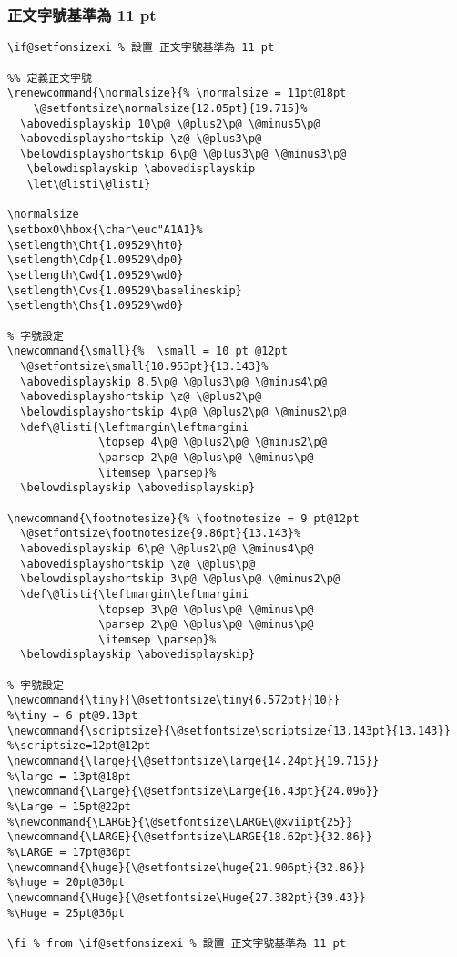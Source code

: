 \clearpage
\subsubsection{正文字號基準為 11 pt}
\begin{lstlisting}[firstnumber=309]
\if@setfonsizexi % 設置 正文字號基準為 11 pt

%% 定義正文字號
\renewcommand{\normalsize}{% \normalsize = 11pt@18pt
    \@setfontsize\normalsize{12.05pt}{19.715}%
  \abovedisplayskip 10\p@ \@plus2\p@ \@minus5\p@
  \abovedisplayshortskip \z@ \@plus3\p@
  \belowdisplayshortskip 6\p@ \@plus3\p@ \@minus3\p@
   \belowdisplayskip \abovedisplayskip
   \let\@listi\@listI}

\normalsize
\setbox0\hbox{\char\euc"A1A1}%
\setlength\Cht{1.09529\ht0}
\setlength\Cdp{1.09529\dp0}
\setlength\Cwd{1.09529\wd0}
\setlength\Cvs{1.09529\baselineskip}
\setlength\Chs{1.09529\wd0}

% 字號設定
\newcommand{\small}{%  \small = 10 pt @12pt
  \@setfontsize\small{10.953pt}{13.143}%
  \abovedisplayskip 8.5\p@ \@plus3\p@ \@minus4\p@
  \abovedisplayshortskip \z@ \@plus2\p@
  \belowdisplayshortskip 4\p@ \@plus2\p@ \@minus2\p@
  \def\@listi{\leftmargin\leftmargini
              \topsep 4\p@ \@plus2\p@ \@minus2\p@
              \parsep 2\p@ \@plus\p@ \@minus\p@
              \itemsep \parsep}%
  \belowdisplayskip \abovedisplayskip}

\newcommand{\footnotesize}{% \footnotesize = 9 pt@12pt
  \@setfontsize\footnotesize{9.86pt}{13.143}%
  \abovedisplayskip 6\p@ \@plus2\p@ \@minus4\p@
  \abovedisplayshortskip \z@ \@plus\p@
  \belowdisplayshortskip 3\p@ \@plus\p@ \@minus2\p@
  \def\@listi{\leftmargin\leftmargini
              \topsep 3\p@ \@plus\p@ \@minus\p@
              \parsep 2\p@ \@plus\p@ \@minus\p@
              \itemsep \parsep}%
  \belowdisplayskip \abovedisplayskip}

% 字號設定
\newcommand{\tiny}{\@setfontsize\tiny{6.572pt}{10}}								    %\tiny = 6 pt@9.13pt
\newcommand{\scriptsize}{\@setfontsize\scriptsize{13.143pt}{13.143}} 	%\scriptsize=12pt@12pt
\newcommand{\large}{\@setfontsize\large{14.24pt}{19.715}}				      %\large = 13pt@18pt
\newcommand{\Large}{\@setfontsize\Large{16.43pt}{24.096}}				      %\Large = 15pt@22pt
%\newcommand{\LARGE}{\@setfontsize\LARGE\@xviipt{25}}
\newcommand{\LARGE}{\@setfontsize\LARGE{18.62pt}{32.86}}  			 		  %\LARGE = 17pt@30pt
\newcommand{\huge}{\@setfontsize\huge{21.906pt}{32.86}}    				    %\huge = 20pt@30pt
\newcommand{\Huge}{\@setfontsize\Huge{27.382pt}{39.43}}   				    %\Huge = 25pt@36pt

\fi % from \if@setfonsizexi % 設置 正文字號基準為 11 pt
\end{lstlisting}


